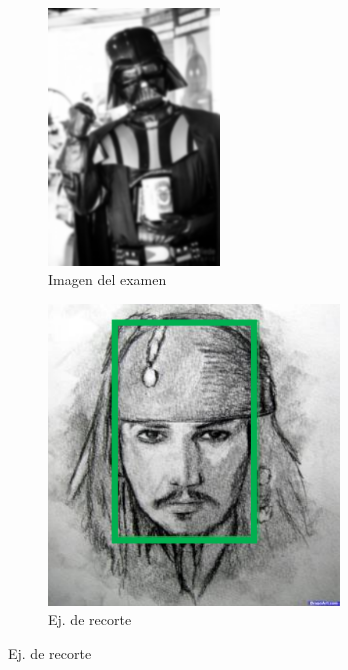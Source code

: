 \documentclass[12pt, a4paper]{article}
\begin{document}
\begin{figure}[!ht]
    \centering
    \begin{subfigure}{0.3\textwidth}
        \centering
        \includegraphics[width=0.5\textwidth]{img/examen_b.png}
        \caption{Imagen del examen}
        \label{img:examen}
    \end{subfigure}
    \hfill
    \begin{subfigure}{0.25\textwidth}
        \centering
        \includegraphics[width=0.85\textwidth]{img/sample-face-only.png}
        \caption{Ej. de recorte}
        \label{img:ejemplo-1}

\end{subfigure}
\end{figure}
\end{document}
